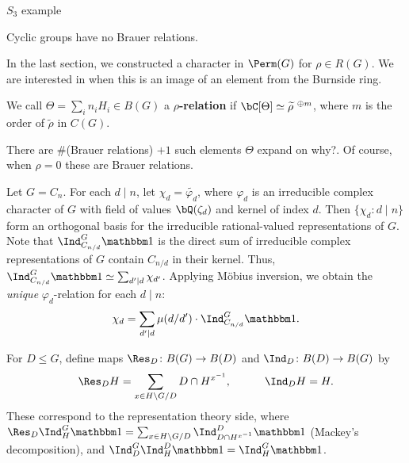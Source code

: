 \begin{example}
    {\color{red} $S_3$ example}
\end{example}

\begin{example}
Cyclic groups have no Brauer relations. 
\end{example}

In the last section, we constructed a character in $\Perm(G)$ for $\rho \in R(G)$. We are interested in when this is an image of an element from the Burnside ring.

\begin{defn}
We call $\Theta = \sum_i n_i H_i \in B(G)$ a \textbf{$\rho$-relation} if $\bC[\Theta] \simeq \widetilde{\rho}^{\ \oplus m}$, where $m$ is the order of $\widetilde{\rho}$ in $C(G)$.
\end{defn}
There are $\#$(Brauer relations) $+ 1$ such elements $\Theta$ {\color{red} expand on why?}. Of course, when $\rho = 0$ these are Brauer relations. 


\begin{example}\label{cyclic-relns}
    Let $G = C_n$. For each $d \mid n$, let $\chi_d = \widetilde{\varphi_d}$, where $\varphi_d$ is an irreducible complex character of $G$ with field of values $\bQ(\zeta_d)$ and kernel of index $d$.
    Then $\{ \chi_d \colon d\mid n \}$ form an orthogonal basis for the irreducible rational-valued representations of $G$. Note that $\Ind_{C_{n/ d}}^G \trivial$ is the direct sum of irreducible complex representations of $G$ contain $C_{n / d}$ in their kernel. Thus, $\Ind_{C_{n/ d}}^G \trivial \simeq \sum_{d' \mid d} \chi_{d'}$. Applying M\"{o}bius inversion, we obtain the \textit{unique} $\varphi_d$-relation for each $d \mid n$:
    \[ \chi_d = \sum_{d' \mid d} \mu(d / d') \cdot \Ind_{C_{n/ d}}^G \trivial. \]
    \end{example}

\begin{notn}
    For $D \leq G$, define maps $\Res_D \colon B(G) \to B(D)$ and $\Ind_D \colon B(D) \to B(G)$ by
    \[  \Res_D H = \sum_{x \in H \backslash G / D} D \cap H^{x^{-1}}, \qquad \quad \Ind_D H = H. \]
    These correspond to the representation theory side, where $\Res_D \Ind_{H}^G \trivial = \sum_{x \in H \backslash G / D} \Ind_{D \cap H^{x^{-1}}}^D \trivial$ (Mackey's decomposition), and $\Ind_{D}^G\Ind_{H}^D \trivial = \Ind_{H}^G \trivial$.
\end{notn}